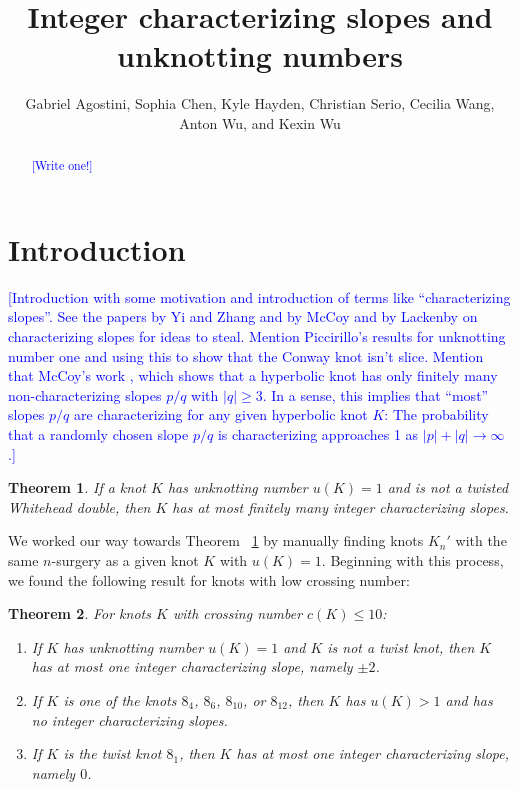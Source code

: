 \documentclass[11pt,usenames,dvipsnames,reqno]{amsart}
\newtheorem{theorem}{Theorem}
\numberwithin{theorem}{section}
\theoremstyle{ex}
\theoremstyle{rem}
\def\kh#1{\textcolor{Blue}{#1}}
\begin{document}


\title{Integer characterizing slopes and unknotting numbers}

\author[G. Agostini, S. Chen, K. Hayden, C. Serio, C. Wang, A. Wu, and K. Wu]{Gabriel Agostini, Sophia Chen, Kyle Hayden, Christian Serio, Cecilia Wang, Anton Wu, and Kexin Wu}



\begin{abstract} 
\kh{[Write one!]}
\end{abstract}


\maketitle

\section{Introduction}\label{sec:intro}

\kh{[Introduction with some motivation and introduction of terms like ``characterizing slopes''. See the papers by Yi and Zhang and by McCoy and by Lackenby on characterizing slopes for ideas to steal. Mention Piccirillo's results for unknotting number one and using this to show that the Conway knot isn't slice. Mention that McCoy's work \cite{mccoy:hyperbolic}, which shows that a hyperbolic knot has only finitely many non-characterizing slopes $p/q$ with $|q| \geq 3$. In a sense, this implies that ``most'' slopes $p/q$ are characterizing for any given hyperbolic knot $K$: The  probability that a randomly chosen slope $p/q$ is characterizing approaches 1 as $|p|+|q|\to \infty$.]}

\begin{theorem}\label{thm:unknotting-one} If a knot $K$ has unknotting number $u(K)=1$ and is not a twisted Whitehead double, then $K$ has at most finitely many integer characterizing slopes.
\end{theorem}

We worked our way towards Theorem ~\ref{thm:unknotting-one} by manually finding knots $K_{n}'$ with the same $n$-surgery as a given knot $K$ with $u(K)=1$. Beginning with this process, we found the following result for knots with low crossing number:

\begin{theorem}\label{thm:low-crossing} For knots $K$ with crossing number $c(K) \leq 10$:
	\begin{enumerate}[label=\normalfont \bf (\alph*)]
		\item If $K$ has unknotting number $u(K)=1$ and $K$ is not a twist knot, then $K$ has at most one integer characterizing slope, namely $\pm 2$.
		\item If $K$ is one of the knots $8_4$, $8_6$, $8_{10}$, or $8_{12}$, then $K$ has $u(K)>1$ and has no integer characterizing slopes.
		\item If $K$ is the twist knot $8_1$, then $K$ has at most one integer characterizing slope, namely $0$.
	\end{enumerate}
\end{theorem}
\end{document}
